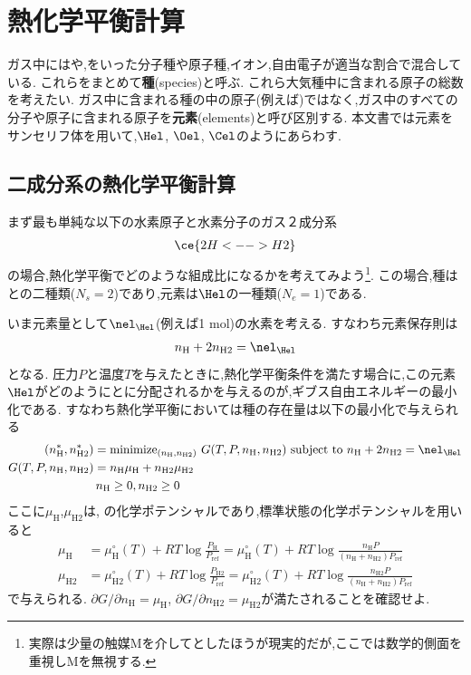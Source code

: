 \section{熱化学平衡計算}

ガス中にはや,をいった分子種や原子種,イオン,自由電子が適当な割合で混合している. これらをまとめて{\bf 種}(species)と呼ぶ. これら大気種中に含まれる原子の総数を考えたい. ガス中に含まれる種の中の原子(例えば)ではなく,ガス中のすべての分子や原子に含まれる原子を{\bf 元素}(elements)と呼び区別する. 本文書では元素をサンセリフ体を用いて,$\Hel$, $\Oel$, $\Cel$のようにあらわす. 


\subsection{二成分系の熱化学平衡計算}

まず最も単純な以下の水素原子と水素分子のガス２成分系
\begin{align*}
\ce{2 H <--> H2}
\end{align*}
の場合,熱化学平衡でどのような組成比になるかを考えてみよう\footnote{実際は少量の触媒Mを介してとしたほうが現実的だが,ここでは数学的側面を重視しMを無視する. }. この場合,種はとの二種類($N_s = 2$)であり,元素は$\Hel$の一種類($N_e = 1$)である. 

いま元素量として$\nel_{\Hel}$(例えば1 mol)の水素を考える. すなわち元素保存則は
\begin{align}
\label{eq:conservation_tce}
    n_\mathrm{H} + 2 n_\mathrm{H2}  = \nel_{\Hel} 
\end{align}
となる. 圧力$P$と温度$T$を与えたときに,熱化学平衡条件を満たす場合に,この元素$\Hel$がどのようにとに分配されるかを与えるのが,ギブス自由エネルギーの最小化である. すなわち熱化学平衡においては種の存在量は以下の最小化で与えられる
\begin{align}
\label{eq:opt1tce}
    (n_\mathrm{H}^\ast, n_\mathrm{H2}^\ast) &= \mathrm{minimize}_{(n_\mathrm{H}, n_\mathrm{H2})} \,\, G(T, P, n_\mathrm{H}, n_\mathrm{H2}) \,\, \mbox{subject to} \,\, n_\mathrm{H} + 2 n_\mathrm{H2} =  \nel_{\Hel}  \\
    G(T, P, n_\mathrm{H}, n_\mathrm{H2}) &= n_\mathrm{H} \mu_\mathrm{H} + n_\mathrm{H2} \mu_\mathrm{H2} \\
     &\, n_\mathrm{H} \ge 0, n_\mathrm{H2} \ge 0
\end{align}
ここに$\mu_\mathrm{H}$,$ \mu_\mathrm{H2}$は, の化学ポテンシャルであり,標準状態の化学ポテンシャルを用いると
\begin{align}
    \mu_\mathrm{H} &= \mu_\mathrm{H}^\circ(T) + RT \log{\frac{P_\mathrm{H}}{P_\mathrm{ref}}} =  \mu_\mathrm{H}^\circ(T) + RT \log{\frac{n_\mathrm{H} P}{(n_\mathrm{H} + n_\mathrm{H2}) P_\mathrm{ref}}} \\
    \mu_\mathrm{H2} &= \mu_\mathrm{H2}^\circ(T) + RT \log{\frac{P_\mathrm{H2}}{P_\mathrm{ref}}} =  \mu_\mathrm{H2}^\circ(T) + RT\log{\frac{n_\mathrm{H2} P}{(n_\mathrm{H} + n_\mathrm{H2}) P_\mathrm{ref}}}
\end{align}
で与えられる. $\partial G/\partial n_\mathrm{H} = \mu_\mathrm{H}$, $\partial G/\partial n_\mathrm{H2} = \mu_\mathrm{H2}$が満たされることを確認せよ. 

